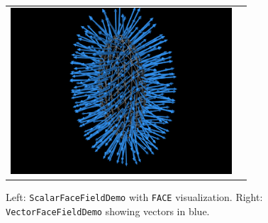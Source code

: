 \begin{figure}[h]
\begin{center}
\begin{tabular}{cc}
 \includegraphics[width=3.25in]{images/VectorFaceFieldDemo}
\fi
\end{tabular}
\end{center}
\caption{Left: {\tt ScalarFaceFieldDemo} with {\tt FACE}
visualization.  Right: {\tt VectorFaceFieldDemo} showing vectors in
blue.}
\label{OtherFields3:fig}

\end{figure}

\ifdefined\maindoc
\else

\fi
